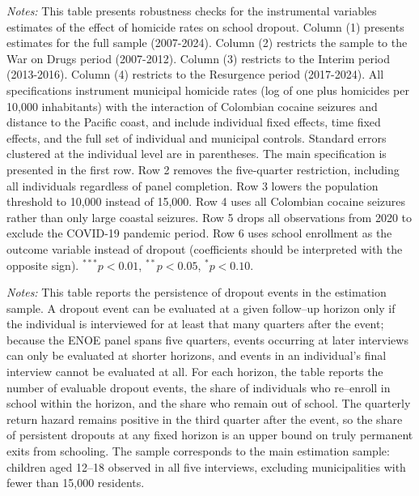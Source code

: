 \documentclass[12pt,letter,english,intoc,bibliography=totoc,index=totoc,BCOR10mm,captions=tableheading,nottitlepage,fleqn]{article}
\theoremstyle{break}
\begin{document}
\begin{table}[H]
\centering
\caption{Additional Robustness Checks}
\label{tab:robustness}
\centering
\scriptsize 

\begin{minipage}{0.95\linewidth}
    \scriptsize \singlespacing
    \textit{Notes:} This table presents robustness checks for the instrumental variables estimates of the effect of homicide rates on school dropout. Column (1) presents estimates for the full sample (2007-2024). Column (2) restricts the sample to the War on Drugs period (2007-2012). Column (3) restricts to the Interim period (2013-2016). Column (4) restricts to the Resurgence period (2017-2024). All specifications instrument municipal homicide rates (log of one plus homicides per 10,000 inhabitants) with the interaction of Colombian cocaine seizures and distance to the Pacific coast, and include individual fixed effects, time fixed effects, and the full set of individual and municipal controls. Standard errors clustered at the individual level are in parentheses. The main specification is presented in the first row. Row 2 removes the five-quarter restriction, including all individuals regardless of panel completion. Row 3 lowers the population threshold to 10,000 instead of 15,000. Row 4 uses all Colombian cocaine seizures rather than only large coastal seizures. Row 5 drops all observations from 2020 to exclude the COVID-19 pandemic period. Row 6 uses school enrollment as the outcome variable instead of dropout (coefficients should be interpreted with the opposite sign).
 $^{***}p<0.01$, $^{**}p<0.05$, $^{*}p<0.10$.
    \end{minipage}
\end{table}

\begin{table}[H]
\centering
\caption{Summary Statistics: Dropout Persistence}
\label{tab:dropout_permanence}
\centering
\footnotesize

\begin{minipage}{0.95\linewidth}
    \scriptsize \singlespacing
    \textit{Notes:} This table reports the persistence of dropout events in the estimation sample. A dropout event can be evaluated at a given follow--up horizon only if the individual is interviewed for at least that many quarters after the event; because the ENOE panel spans five quarters, events occurring at later interviews can only be evaluated at shorter horizons, and events in an individual's final interview cannot be evaluated at all. For each horizon, the table reports the number of evaluable dropout events, the share of individuals who re--enroll in school within the horizon, and the share who remain out of school. The quarterly return hazard remains positive in the third quarter after the event, so the share of persistent dropouts at any fixed horizon is an upper bound on truly permanent exits from schooling. The sample corresponds to the main estimation sample: children aged 12--18 observed in all five interviews, excluding municipalities with fewer than 15{,}000 residents.
    \end{minipage}
\end{table}
\end{document}
